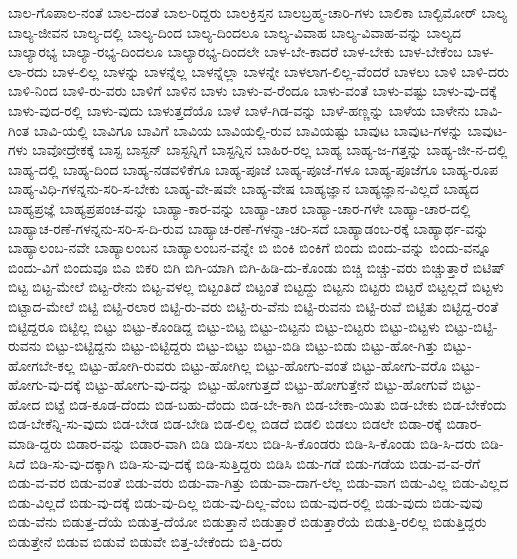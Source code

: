 {ಬಾಲ-ಗೊಪಾಲ-ನಂತೆ
ಬಾಲ-ದಂತೆ
ಬಾಲ-ರಿದ್ದರು
ಬಾಲಕ್ರಿಸ್ತನ
ಬಾಲಬ್ರಹ್ಮ-ಚಾರಿ-ಗಳು
ಬಾಲಿಕಾ
ಬಾಲ್ಟಿಮೋರ್
ಬಾಲ್ಯ
ಬಾಲ್ಯ-ಜೀವನ
ಬಾಲ್ಯ-ದಲ್ಲಿ
ಬಾಲ್ಯ-ದಿಂದ
ಬಾಲ್ಯ-ದಿಂದಲೂ
ಬಾಲ್ಯ-ವಿವಾಹ
ಬಾಲ್ಯ-ವಿವಾಹ-ವನ್ನು
ಬಾಲ್ಯದ
ಬಾಲ್ಯಾರಭ್ಯ
ಬಾಲ್ಯಾ-ರಭ್ಯ-ದಿಂದಲೂ
ಬಾಲ್ಯಾರಭ್ಯ-ದಿಂದಲೇ
ಬಾಳ-ಬೇ-ಕಾದರೆ
ಬಾಳ-ಬೇಕು
ಬಾಳ-ಬೇಕೆಂಬ
ಬಾಳ-ಲಾ-ರದು
ಬಾಳ-ಲಿಲ್ಲ
ಬಾಳನ್ನು
ಬಾಳನ್ನೆಲ್ಲ
ಬಾಳನ್ನೆಲ್ಲಾ
ಬಾಳನ್ನೇ
ಬಾಳಲಾಗ-ಲಿಲ್ಲ-ವೆಂದರೆ
ಬಾಳಲು
ಬಾಳಿ
ಬಾಳಿ-ದರು
ಬಾಳಿ-ನಿಂದ
ಬಾಳಿ-ರು-ವರು
ಬಾಳಿಗೆ
ಬಾಳಿನ
ಬಾಳು
ಬಾಳು-ವ-ರೆಂದೂ
ಬಾಳು-ವಂತೆ
ಬಾಳು-ವಷ್ಟು
ಬಾಳು-ವು-ದಕ್ಕೆ
ಬಾಳು-ವುದ-ರಲ್ಲಿ
ಬಾಳು-ವುದು
ಬಾಳುತ್ತದೆಯೊ
ಬಾಳೆ
ಬಾಳೆ-ಗಿಡ-ವನ್ನು
ಬಾಳೆ-ಹಣ್ಣನ್ನು
ಬಾಳೆಯ
ಬಾಳೇನು
ಬಾವಿ-ಗಿಂತ
ಬಾವಿ-ಯಲ್ಲಿ
ಬಾವಿಗೂ
ಬಾವಿಗೆ
ಬಾವಿಯ
ಬಾವಿಯಲ್ಲಿ-ರುವ
ಬಾವಿಯಷ್ಟು
ಬಾವುಟ
ಬಾವುಟ-ಗಳನ್ನು
ಬಾವುಟ-ಗಳು
ಬಾವೋದ್ರೇಕಕ್ಕೆ
ಬಾಸ್ಟ
ಬಾಸ್ಟನ್
ಬಾಸ್ಟನ್ನಿಗೆ
ಬಾಸ್ಟನ್ನಿನ
ಬಾಹಿರ-ರಲ್ಲ
ಬಾಹ್ಯ
ಬಾಹ್ಯ-ಜ-ಗತ್ತನ್ನು
ಬಾಹ್ಯ-ಜೀ-ನ-ದಲ್ಲಿ
ಬಾಹ್ಯ-ದಲ್ಲಿ
ಬಾಹ್ಯ-ದಿಂದ
ಬಾಹ್ಯ-ನಡವಳಿಕೆಗೂ
ಬಾಹ್ಯ-ಪೂಜೆ
ಬಾಹ್ಯ-ಪೂಜೆ-ಗಳೂ
ಬಾಹ್ಯ-ಪೂಜೆಗೂ
ಬಾಹ್ಯ-ರೂಪ
ಬಾಹ್ಯ-ವಿಧಿ-ಗಳನ್ನನು-ಸರಿ-ಸ-ಬೇಕು
ಬಾಹ್ಯ-ವೇ-ಷವೇ
ಬಾಹ್ಯ-ವೇಷ
ಬಾಹ್ಯಜ್ಞಾನ
ಬಾಹ್ಯಜ್ಞಾನ-ವಿಲ್ಲದೆ
ಬಾಹ್ಯದ
ಬಾಹ್ಯಪ್ರಜ್ಞೆ
ಬಾಹ್ಯಪ್ರಪಂಚ-ವನ್ನು
ಬಾಹ್ಯಾ-ಕಾರ-ವನ್ನು
ಬಾಹ್ಯಾ-ಚಾರ
ಬಾಹ್ಯಾ-ಚಾರ-ಗಳೇ
ಬಾಹ್ಯಾ-ಚಾರ-ದಲ್ಲಿ
ಬಾಹ್ಯಾಚ-ರಣೆ-ಗಳನ್ನನು-ಸರಿ-ಸ-ದಿ-ರುವ
ಬಾಹ್ಯಾಚ-ರಣೆ-ಗಳನ್ನಾ-ಚರಿ-ಸದೆ
ಬಾಹ್ಯಾಡಂಬ-ರಕ್ಕೆ
ಬಾಹ್ಯಾರ್ಥ-ವನ್ನು
ಬಾಹ್ಯಾಲಂಬ-ನವೇ
ಬಾಹ್ಯಾಲಂಬನ
ಬಾಹ್ಯಾಲಂಬನ-ವನ್ನೇ
ಬಿ
ಬಿಂಕಿ
ಬಿಂಕಿಗೆ
ಬಿಂದು
ಬಿಂದು-ವನ್ನು
ಬಿಂದು-ವನ್ನೂ
ಬಿಂದು-ವಿಗೆ
ಬಿಂದುವೂ
ಬಿಎ
ಬಿಕರಿ
ಬಿಗಿ
ಬಿಗಿ-ಯಾಗಿ
ಬಿಗಿ-ಹಿಡಿ-ದು-ಕೊಂಡು
ಬಿಚ್ಚಿ
ಬಿಚ್ಚು-ವರು
ಬಿಚ್ಚುತ್ತಾರೆ
ಬಿಟಿಷ್
ಬಿಟ್ಟ
ಬಿಟ್ಟ-ಮೇಲೆ
ಬಿಟ್ಟ-ರೇನು
ಬಿಟ್ಟ-ವಳಲ್ಲ
ಬಿಟ್ಟಂತಿದೆ
ಬಿಟ್ಟಂತೆ
ಬಿಟ್ಟದ್ದು
ಬಿಟ್ಟನು
ಬಿಟ್ಟರು
ಬಿಟ್ಟರೆ
ಬಿಟ್ಟಲ್ಲದೆ
ಬಿಟ್ಟಳು
ಬಿಟ್ಟಾದ-ಮೇಲೆ
ಬಿಟ್ಟಿ
ಬಿಟ್ಟಿ-ರಲಾರ
ಬಿಟ್ಟಿ-ರು-ವರು
ಬಿಟ್ಟಿ-ರು-ವೆನು
ಬಿಟ್ಟಿ-ರುವನು
ಬಿಟ್ಟಿ-ರುವೆ
ಬಿಟ್ಟಿತು
ಬಿಟ್ಟಿದ್ದ-ರಂತೆ
ಬಿಟ್ಟಿದ್ದರೂ
ಬಿಟ್ಟಿಲ್ಲ
ಬಿಟ್ಟು
ಬಿಟ್ಟು-ಕೊಂಡಿದ್ದ
ಬಿಟ್ಟು-ಬಿಟ್ಟ
ಬಿಟ್ಟು-ಬಿಟ್ಟನು
ಬಿಟ್ಟು-ಬಿಟ್ಟರು
ಬಿಟ್ಟು-ಬಿಟ್ಟಳು
ಬಿಟ್ಟು-ಬಿಟ್ಟಿ-ರುವನು
ಬಿಟ್ಟು-ಬಿಟ್ಟಿದ್ದನು
ಬಿಟ್ಟು-ಬಿಟ್ಟಿದ್ದರು
ಬಿಟ್ಟು-ಬಿಟ್ಟು
ಬಿಟ್ಟು-ಬಿಡಿ
ಬಿಟ್ಟು-ಬಿಡು
ಬಿಟ್ಟು-ಹೋ-ಗಿತ್ತು
ಬಿಟ್ಟು-ಹೋಗಬೇ-ಕಲ್ಲ
ಬಿಟ್ಟು-ಹೋಗಿ-ರುವರು
ಬಿಟ್ಟು-ಹೋಗಿಲ್ಲ
ಬಿಟ್ಟು-ಹೋಗು-ವಂತೆ
ಬಿಟ್ಟು-ಹೋಗು-ವರೊ
ಬಿಟ್ಟು-ಹೋಗು-ವು-ದಕ್ಕೆ
ಬಿಟ್ಟು-ಹೋಗು-ವು-ದನ್ನು
ಬಿಟ್ಟು-ಹೋಗುತ್ತದೆ
ಬಿಟ್ಟು-ಹೋಗುತ್ತೇನೆ
ಬಿಟ್ಟು-ಹೋಗುವೆ
ಬಿಟ್ಟು-ಹೋದ
ಬಿಟ್ಟೆ
ಬಿಡ-ಕೂಡ-ದೆಂದು
ಬಿಡ-ಬಹು-ದೆಂದು
ಬಿಡ-ಬೇ-ಕಾಗಿ
ಬಿಡ-ಬೇಕಾ-ಯಿತು
ಬಿಡ-ಬೇಕು
ಬಿಡ-ಬೇಕೆಂದು
ಬಿಡ-ಬೇಕೆನ್ನಿ-ಸು-ವುದು
ಬಿಡ-ಬೇಡ
ಬಿಡ-ಬೇಡಿ
ಬಿಡ-ಲಿಲ್ಲ
ಬಿಡದೆ
ಬಿಡಲಿ
ಬಿಡಲು
ಬಿಡಲೇ
ಬಿಡಾ-ರಕ್ಕೆ
ಬಿಡಾರ-ಮಾಡಿ-ದ್ದರು
ಬಿಡಾರ-ವನ್ನು
ಬಿಡಾರ-ವಾಗಿ
ಬಿಡಿ
ಬಿಡಿ-ಸಲು
ಬಿಡಿ-ಸಿ-ಕೊಂಡರು
ಬಿಡಿ-ಸಿ-ಕೊಂಡು
ಬಿಡಿ-ಸಿ-ದರು
ಬಿಡಿ-ಸಿದೆ
ಬಿಡಿ-ಸು-ವು-ದಕ್ಕಾಗಿ
ಬಿಡಿ-ಸು-ವು-ದಕ್ಕೆ
ಬಿಡಿ-ಸುತ್ತಿದ್ದರು
ಬಿಡಿಸಿ
ಬಿಡು-ಗಡೆ
ಬಿಡು-ಗಡೆಯ
ಬಿಡು-ವ-ವ-ರೆಗೆ
ಬಿಡು-ವ-ವರ
ಬಿಡು-ವಂತೆ
ಬಿಡು-ವರು
ಬಿಡು-ವಾ-ಗಿತ್ತು
ಬಿಡು-ವಾ-ದಾಗ-ಲೆಲ್ಲ
ಬಿಡು-ವಾಗ
ಬಿಡು-ವಿಲ್ಲ
ಬಿಡು-ವಿಲ್ಲದ
ಬಿಡು-ವಿಲ್ಲದೆ
ಬಿಡು-ವು-ದಕ್ಕೆ
ಬಿಡು-ವು-ದಿಲ್ಲ
ಬಿಡು-ವು-ದಿಲ್ಲ-ವೆಂಬ
ಬಿಡು-ವುದ-ರಲ್ಲಿ
ಬಿಡು-ವುದು
ಬಿಡು-ವುವು
ಬಿಡು-ವೆನು
ಬಿಡುತ್ತ-ದೆಯೆ
ಬಿಡುತ್ತ-ದೆಯೋ
ಬಿಡುತ್ತಾನೆ
ಬಿಡುತ್ತಾರೆ
ಬಿಡುತ್ತಾರೆಯೆ
ಬಿಡುತ್ತಿ-ರಲಿಲ್ಲ
ಬಿಡುತ್ತಿದ್ದರು
ಬಿಡುತ್ತೇನೆ
ಬಿಡುವ
ಬಿಡುವೆ
ಬಿಡುವೇ
ಬಿತ್ತ-ಬೇಕೆಂದು
ಬಿತ್ತಿ-ದರು
}
